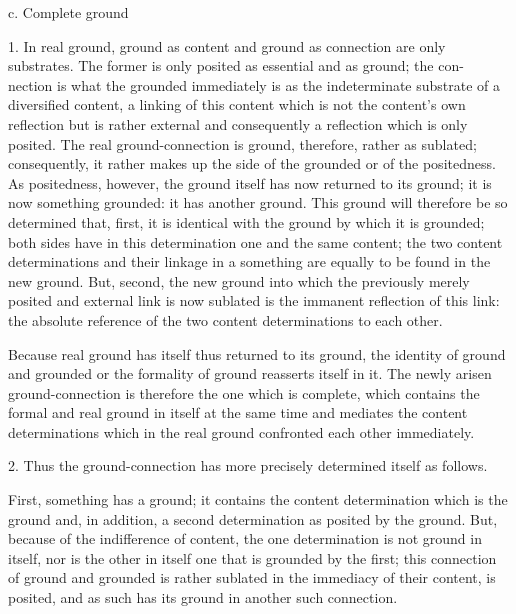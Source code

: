 c. Complete ground

1. In real ground, ground as content and ground as connection are only
substrates. The former is only posited as essential and as ground; the con-
nection is what the grounded immediately is as the indeterminate substrate
of a diversified content, a linking of this content which is not the content's
own reflection but is rather external and consequently a reflection which
is only posited. The real ground-connection is ground, therefore, rather as
sublated; consequently, it rather makes up the side of the grounded or of
the positedness. As positedness, however, the ground itself has now returned
to its ground; it is now something grounded: it has another ground. This
ground will therefore be so determined that, first, it is identical with the
ground by which it is grounded; both sides have in this determination one
and the same content; the two content determinations and their linkage in
a something are equally to be found in the new ground. But, second, the
new ground into which the previously merely posited and external link is
now sublated is the immanent reflection of this link: the absolute reference
of the two content determinations to each other.

Because real ground has itself thus returned to its ground, the identity
of ground and grounded or the formality of ground reasserts itself in it.
The newly arisen ground-connection is therefore the one which is complete,
which contains the formal and real ground in itself at the same time and
mediates the content determinations which in the real ground confronted
each other immediately.

2. Thus the ground-connection has more precisely
determined itself as follows.

First, something has a ground;
it contains the content determination which is the ground
and, in addition, a second determination as posited by the ground.
But, because of the indifference of content,
the one determination is not ground in itself,
nor is the other in itself one that is grounded by the first;
this connection of ground and grounded is rather
sublated in the immediacy of their content, is posited,
and as such has its ground in another such connection.

